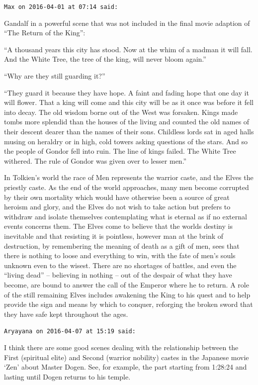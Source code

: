 \begin{footnotesize}
\begin{sffamily}
\hfill

\texttt{Max on 2016-04-01 at 07:14 said:}

Gandalf in a powerful scene that was not included in the final movie adaption of ``The Return of the King'':

``A thousand years this city has stood. Now at the whim of a madman it will fall. And the White Tree, the tree of the king, will never bloom again.''

``Why are they still guarding it?''

``They guard it because they have hope. A faint and fading hope that one day it will flower. That a king will come and this city will be as it once was before it fell into decay. The old wisdom borne out of the West was forsaken. Kings made tombs more splendid than the houses of the living and counted the old names of their descent dearer than the names of their sons. Childless lords sat in aged halls musing on heraldry or in high, cold towers asking questions of the stars. And so the people of Gondor fell into ruin. The line of kings failed. The White Tree withered. The rule of Gondor was given over to lesser men.''

In Tolkien's world the race of Men represents the warrior caste, and the Elves the priestly caste. As the end of the world approaches, many men become corrupted by their own mortality which would have otherwise been a source of great heroism and glory, and the Elves do not wish to take action but prefers to withdraw and isolate themselves contemplating what is eternal as if no external events concerns them. The Elves come to believe that the worlds destiny is inevitable and that resisting it is pointless, however man at the brink of destruction, by remembering the meaning of death as a gift of men, sees that there is nothing to loose and everything to win, with the fate of men's souls unknown even to the wisest. There are no shortages of battles, and even the ``living dead'' -- believing in nothing -- out of the despair of what they have become, are bound to answer the call of the Emperor where he to return. A role of the still remaining Elves includes awakening the King to his quest and to help provide the sign and means by which to conquer, reforging the broken sword that they have safe kept throughout the ages.

\hfill

\texttt{Aryayana on 2016-04-07 at 15:19 said:}

I think there are some good scenes dealing with the relationship between the First (spiritual elite) and Second (warrior nobility) castes in the Japanese movie `Zen' about Master Dogen. See, for example, the part starting from 1:28:24 and lasting until Dogen returns to his temple.


\end{sffamily}
\end{footnotesize}
